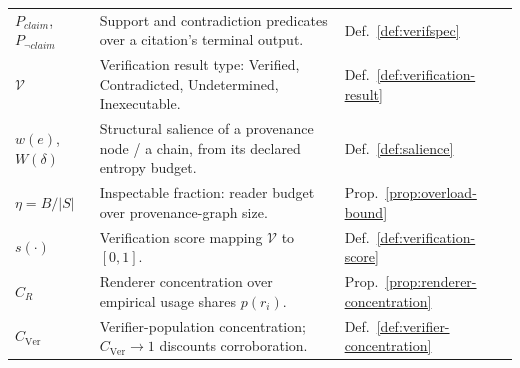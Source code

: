 \documentclass[11pt]{article}
\theoremstyle{definition}
\begin{document}
\begin{longtable}{@{}p{}p{}p{}@{}}
$P_{\mathit{claim}}$, $P_{\neg\mathit{claim}}$ & Support and contradiction predicates over a citation's terminal output. & Def.~\ref{def:verifspec} \\
$\mathcal{V}$ & Verification result type: Verified, Contradicted, Undetermined, Inexecutable. & Def.~\ref{def:verification-result} \\
$w(e)$, $W(\delta)$ & Structural salience of a provenance node / a chain, from its declared entropy budget. & Def.~\ref{def:salience} \\
$\eta = B/|S|$ & Inspectable fraction: reader budget over provenance-graph size. & Prop.~\ref{prop:overload-bound} \\
$s(\cdot)$ & Verification score mapping $\mathcal{V}$ to $[0,1]$. & Def.~\ref{def:verification-score} \\
$C_R$ & Renderer concentration over empirical usage shares $p(r_i)$. & Prop.~\ref{prop:renderer-concentration} \\
$C_{\mathrm{Ver}}$ & Verifier-population concentration; $C_{\mathrm{Ver}}\to 1$ discounts corroboration. & Def.~\ref{def:verifier-concentration} \\
\bottomrule
\end{longtable}
\end{document}
